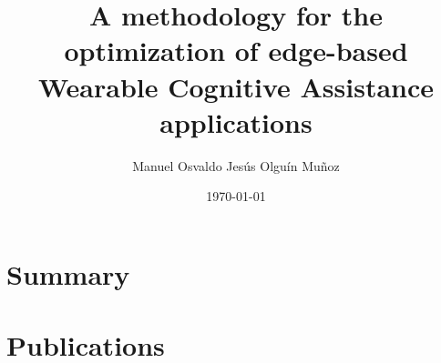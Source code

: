 \documentclass[electronic,oldfontcommands]{kthesis}
\theoremstyle{definition}
\begin{document}
\title{A methodology for the optimization of edge-based Wearable Cognitive Assistance applications}
\subtitle{{}}
\author{Manuel {Osvaldo Jesús} {Olguín Muñoz}}
\date{\today}
\address{%
	KTH Royal Institute of Technology\\%
	School of Electrical Engineering and Computer Science\\%
	Division of Information Science and Engineering\\%
	SE-10044 Stockholm\\%
	Sweden%
}

\maketitle

\frontmatter %






\mainmatter %

\tableofcontents*{}
\part{Summary}





\part{Publications}







\end{document}
